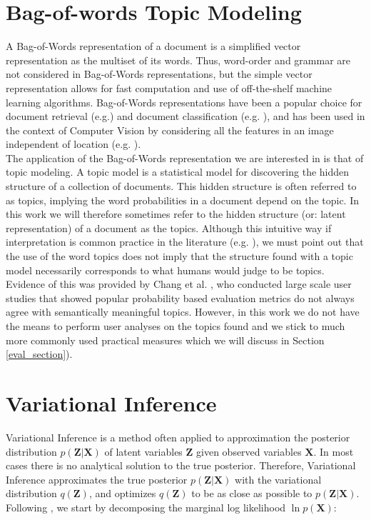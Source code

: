 \documentclass{report}
\begin{document}
\section{Bag-of-words Topic Modeling}\label{topmod}
A Bag-of-Words representation of a document is a simplified vector representation as the multiset of its words. Thus, word-order and grammar are not considered in Bag-of-Words representations, but the simple vector representation allows for fast computation and use of off-the-shelf machine learning algorithms. Bag-of-Words representations have been a popular choice for document retrieval (e.g.\cite{landauer1990fully}) and document classification (e.g. \cite{li1998classification}), and has been used in the context of Computer Vision by considering all the features in an image independent of location (e.g. \cite{fei2005bayesian}). \\
The application of the Bag-of-Words representation we are interested in is that of topic modeling. A topic model is a statistical model for discovering the hidden structure of a collection of documents. This hidden structure is often referred to as topics, implying the word probabilities in a document depend on the topic. In this work we will therefore sometimes refer to the hidden structure (or: latent representation) of a document as the topics. Although this intuitive way if interpretation is common practice in the literature (e.g. \cite{blei2003latent}), we must point out that the use of the word topics does not imply that the structure found with a topic model necessarily corresponds to what humans would judge to be topics. Evidence of this was provided by Chang et al. \cite{chang2009reading}, who conducted large scale user studies that showed popular probability based evaluation metrics do not always agree with semantically meaningful topics. However, in this work we do not have the means to perform user analyses on the topics found and we stick to much more commonly used practical measures which we will discuss in Section \ref{eval_section}).

\section{Variational Inference}\label{varinf}
Variational Inference is a method often applied to approximation the posterior distribution $p(\mathbf{Z}|\mathbf{X})$ of latent variables $\mathbf{Z}$ given observed variables $\mathbf{X}$. In most cases there is no analytical solution to the true posterior. Therefore, Variational Inference approximates the true posterior $p(\mathbf{Z}|\mathbf{X})$ with the variational distribution $q(\mathbf{Z})$, and optimizes $q(\mathbf{Z})$ to be as close as possible to $p(\mathbf{Z}|\mathbf{X})$. \\
Following \cite{bishop2006pattern}, we start by decomposing the marginal log likelihood $\ln p(\mathbf{X})$:
\end{document}

